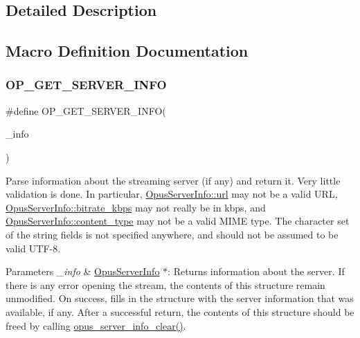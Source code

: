 \subsection{Detailed Description}


\subsection{Macro Definition Documentation}
\mbox{\label{group__url__options_gacc2e4b086bee832d5d66caf18fd7d659}} 
\subsubsection{\texorpdfstring{OP\_GET\_SERVER\_INFO}{OP\_GET\_SERVER\_INFO}}
{\footnotesize\ttfamily \#define O\+P\+\_\+\+G\+E\+T\+\_\+\+S\+E\+R\+V\+E\+R\+\_\+\+I\+N\+FO(\begin{DoxyParamCaption}\item[{}]{\+\_\+info }\end{DoxyParamCaption})}

Parse information about the streaming server (if any) and return it. Very little validation is done. In particular, \mbox{\hyperlink{struct_opus_server_info_a7f9aef47413c849bb240ef70394401b1}{Opus\+Server\+Info\+::url}} may not be a valid U\+RL, \mbox{\hyperlink{struct_opus_server_info_a1cf5db210f1cad5cf809bf54ddff68de}{Opus\+Server\+Info\+::bitrate\+\_\+kbps}} may not really be in kbps, and \mbox{\hyperlink{struct_opus_server_info_a5f0120b006af1122cbdc72f3cbb68fd7}{Opus\+Server\+Info\+::content\+\_\+type}} may not be a valid M\+I\+ME type. The character set of the string fields is not specified anywhere, and should not be assumed to be valid U\+T\+F-\/8. 
\begin{DoxyParams}{Parameters}
{\em \+\_\+info} & \mbox{\hyperlink{struct_opus_server_info}{Opus\+Server\+Info}} $\ast$\+: Returns information about the server. If there is any error opening the stream, the contents of this structure remain unmodified. On success, fills in the structure with the server information that was available, if any. After a successful return, the contents of this structure should be freed by calling \mbox{\hyperlink{group__url__options_ga096536e460277fe890acb265d8fdbd63}{opus\+\_\+server\+\_\+info\+\_\+clear()}}. \\
\hline
\end{DoxyParams}



